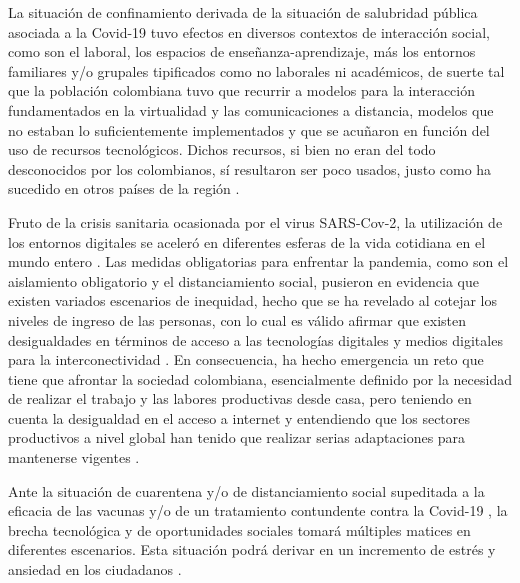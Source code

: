 \documentclass[spanish]{textolivre}
\begin{document}
La situación de confinamiento derivada de la situación de salubridad pública asociada a la Covid-19 tuvo efectos en diversos contextos de interacción social, como son el laboral, los espacios de enseñanza-aprendizaje, más los entornos familiares y/o grupales tipificados como no laborales ni académicos, de suerte tal que la población colombiana tuvo que recurrir a modelos para la interacción fundamentados en la virtualidad y las comunicaciones a distancia, modelos que no estaban lo suficientemente implementados y que se acuñaron en función del uso de recursos tecnológicos. Dichos recursos, si bien no eran del todo desconocidos por los colombianos, sí resultaron ser poco usados, justo como ha sucedido en otros países de la región \cite{benitez2020}.

Fruto de la crisis sanitaria ocasionada por el virus SARS-Cov-2, la utilización de los entornos digitales se aceleró en diferentes esferas de la vida cotidiana en el mundo entero \cite{bartsch2020}. Las medidas obligatorias para enfrentar la pandemia, como son el aislamiento obligatorio y el distanciamiento social, pusieron en evidencia que existen variados escenarios de inequidad, hecho que se ha revelado al cotejar los niveles de ingreso de las personas, con lo cual es válido afirmar que existen desigualdades en términos de acceso a las tecnologías digitales y medios digitales para la interconectividad \cite{beaunoyer2020}. En consecuencia, ha hecho emergencia un reto que tiene que afrontar la sociedad colombiana, esencialmente definido por la necesidad de realizar el trabajo y las labores productivas desde casa, pero teniendo en cuenta la desigualdad en el acceso a internet y entendiendo que los sectores productivos a nivel global han tenido que realizar serias adaptaciones para mantenerse vigentes \cite{donthu2020}.

Ante la situación de cuarentena y/o de distanciamiento social supeditada a la eficacia de las vacunas y/o de un tratamiento contundente contra la Covid-19 \cite{chowdhury2020}, la brecha tecnológica y de oportunidades sociales tomará múltiples matices en diferentes escenarios. Esta situación podrá derivar en un incremento de estrés y ansiedad en   los ciudadanos \cite{asmundson2020}.
\end{document}
